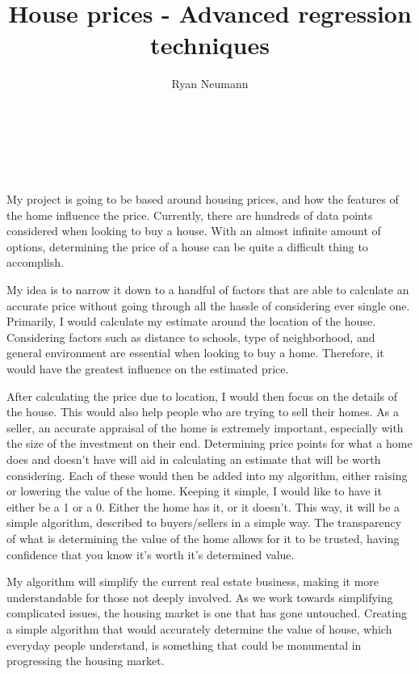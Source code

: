 \documentclass[10pt]{article}
\begin{document}
\begin{center}
\title{House prices - Advanced regression techniques}  \
\author{Ryan Neumann} \

    My project is going to be based around housing prices, and how the features of the home influence the price.  Currently, there are hundreds of data points considered when looking to buy a house.  With an almost infinite amount of options, determining the price of a house can be quite a difficult thing to accomplish.   \par

  My idea is to narrow it down to a handful of factors that are able to calculate an accurate price without going through all the hassle of considering ever single one.  Primarily, I would calculate my estimate around the location of the house.  Considering factors such as distance to schools, type of neighborhood, and general environment are essential when looking to buy a home.  Therefore, it would have the greatest influence on the estimated price. \par

  After calculating the price due to location, I would then focus on the details of the house.  This would also help people who are trying to sell their homes.  As a seller, an accurate appraisal of the home is extremely important, especially with the size of the investment on their end.  Determining price points for what a home does and doesn't have will aid in calculating an estimate that will be worth considering.  Each of these would then be added into my algorithm, either raising or lowering the value of the home.  Keeping it simple, I would like to have it either be a 1 or a 0.  Either the home has it, or it doesn't.  This way, it will be a simple algorithm, described to buyers/sellers in a simple way.  The transparency of what is determining the value of the home allows for it to be trusted, having confidence that you know it's worth it's determined value.  \par

  My algorithm will simplify the current real estate business, making it more understandable for those not deeply involved.  As we work towards simplifying complicated issues, the housing market is one that has gone untouched.  Creating a simple algorithm that would accurately determine the value of house, which everyday people understand, is something that could be monumental in progressing the housing market.  
\end{center}
\end{document}
